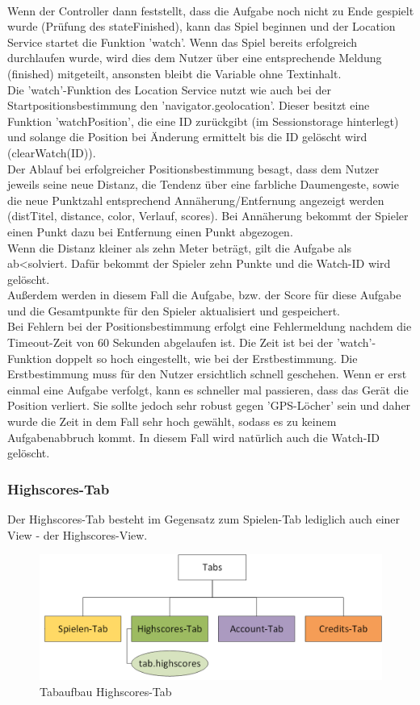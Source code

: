 \\
Wenn der Controller dann feststellt, dass die Aufgabe noch nicht zu Ende gespielt wurde (Prüfung des stateFinished), kann das Spiel beginnen und der Location Service startet die Funktion 'watch'. Wenn das Spiel bereits erfolgreich durchlaufen wurde, wird dies dem Nutzer über eine entsprechende Meldung (finished) mitgeteilt, ansonsten bleibt die Variable ohne Textinhalt.
\\
Die 'watch'-Funktion des Location Service nutzt wie auch bei der Startpositionsbestimmung den 'navigator.geolocation'. Dieser besitzt eine Funktion 'watchPosition', die eine ID zurückgibt (im Sessionstorage hinterlegt) und solange die Position bei Änderung ermittelt bis die ID gelöscht wird (clearWatch(ID)).
\\
Der Ablauf bei erfolgreicher Positionsbestimmung besagt, dass dem Nutzer jeweils seine neue Distanz, die Tendenz über eine farbliche Daumengeste, sowie die neue Punktzahl entsprechend Annäherung/Entfernung angezeigt werden (distTitel, distance, color, Verlauf, scores). Bei Annäherung bekommt der Spieler einen Punkt dazu bei Entfernung einen Punkt abgezogen.
\\
Wenn die Distanz kleiner als zehn Meter beträgt, gilt die Aufgabe als ab<solviert. Dafür bekommt der Spieler zehn Punkte und die Watch-ID wird gelöscht.
\\
Außerdem werden in diesem Fall die Aufgabe, bzw. der Score für diese Aufgabe und die Gesamtpunkte für den Spieler aktualisiert und gespeichert.
\\
Bei Fehlern bei der Positionsbestimmung erfolgt eine Fehlermeldung nachdem die Timeout-Zeit von 60 Sekunden abgelaufen ist. Die Zeit ist bei der 'watch'-Funktion doppelt so hoch eingestellt, wie bei der Erstbestimmung. Die Erstbestimmung muss für den Nutzer ersichtlich schnell geschehen. Wenn er erst einmal eine Aufgabe verfolgt, kann es schneller mal passieren, dass das Gerät die Position verliert. Sie sollte jedoch sehr robust gegen 'GPS-Löcher' sein und daher wurde die Zeit in dem Fall sehr hoch gewählt, sodass es zu keinem Aufgabenabbruch kommt. In diesem Fall wird natürlich auch die Watch-ID gelöscht.
\subsubsection{Highscores-Tab}
Der Highscores-Tab besteht im Gegensatz zum Spielen-Tab lediglich auch einer View - der Highscores-View.
\\
\begin{figure}[h]
\centering
\includegraphics[width=1\textwidth]{ref/images/tabs_highscores.png}
\caption[Tabaufbau Highscores-Tab]{Tabaufbau Highscores-Tab}
\label{fig:Tabaufbau Highscores-Tab}
\end{figure}

